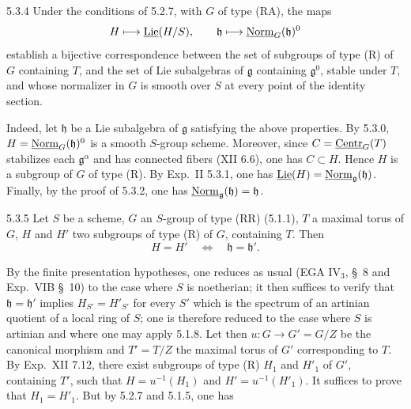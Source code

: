 \begin{corollary}{5.3.4}\label{XXII.5.3.4}
Under the conditions of 5.2.7, with $G$ of type (RA), the maps
\[
H\longmapsto\underline{\operatorname{Lie}}(H/S),\qquad\mathfrak h\longmapsto\underline{\mathrm{Norm}}_G(\mathfrak h)^0
\]
establish a bijective correspondence between the set of subgroups of type (R) of $G$ containing $T$, and the set of Lie subalgebras of $\mathfrak g$ containing $\mathfrak g^0$, stable under $T$, and whose normalizer in $G$ is smooth over $S$ at every point of the identity section.
\end{corollary}
{\renewcommand{\thefootnote}{(31)}}%
Indeed, let $\mathfrak h$ be a Lie subalgebra of $\mathfrak g$ satisfying the above properties. By 5.3.0, $H=\underline{\mathrm{Norm}}_G(\mathfrak h)^0$ is a smooth $S$-group scheme. Moreover, since $C=\underline{\mathrm{Centr}}_G(T)$ stabilizes each $\mathfrak g^\alpha$ and has connected fibers (XII 6.6), one has $C\subset H$. Hence $H$ is a subgroup of $G$ of type (R). By Exp.~II 5.3.1, one has $\underline{\operatorname{Lie}}(H)=\underline{\mathrm{Norm}}_{\mathfrak g}(\mathfrak h)$. Finally, by the proof of 5.3.2, one has $\underline{\mathrm{Norm}}_{\mathfrak g}(\mathfrak h)=\mathfrak h$.
\begin{corollary}{5.3.5}\label{XXII.5.3.5}
Let $S$ be a scheme, $G$ an $S$-group of type (RR) (5.1.1), $T$ a maximal torus of $G$, $H$ and $H'$ two subgroups of type (R) of $G$, containing $T$. Then
\[
H=H'\quad\Longleftrightarrow\quad\mathfrak h=\mathfrak h'.
\]
\end{corollary}
By the finite presentation hypotheses, one reduces as usual (\cf EGA IV$_3$, \S~8 and Exp.~VIB \S~10) to the case where $S$ is noetherian; it then suffices to verify that $\mathfrak h=\mathfrak h'$ implies $H_{S'}=H'_{S'}$ for every $S'$ which is the spectrum of an artinian quotient of a local ring of $S$;{\renewcommand{\thefootnote}{(32)}} one is therefore reduced to the case where $S$ is artinian and where one may apply 5.1.8. Let then $u:G\to G'=G/Z$ be the canonical morphism and $T'=T/Z$ the maximal torus of $G'$ corresponding to $T$. By Exp.~XII 7.12, there exist subgroups of type (R) $H_1$ and $H'_1$ of $G'$, containing $T'$, such that $H=u^{-1}(H_1)$ and $H'=u^{-1}(H'_1)$. It suffices to prove that $H_1=H'_1$. But by 5.2.7 and 5.1.5, one has
